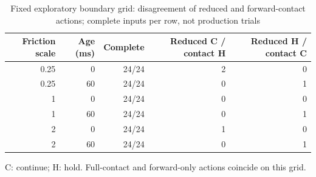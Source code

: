 \begin{table}[t]
\caption{Fixed exploratory boundary grid: disagreement of reduced and forward-contact actions; complete inputs per row, not production trials}
\label{tab:boundary}
\centering\small
\begin{tabular}{rrrrr}
\toprule
Friction scale & Age (ms) & Complete & Reduced C / contact H & Reduced H / contact C\\
\midrule
0.25 & 0 & 24/24 & 2 & 0\\
0.25 & 60 & 24/24 & 0 & 1\\
1 & 0 & 24/24 & 0 & 0\\
1 & 60 & 24/24 & 0 & 1\\
2 & 0 & 24/24 & 1 & 0\\
2 & 60 & 24/24 & 0 & 1\\
\bottomrule
\end{tabular}
\par\smallskip\footnotesize C: continue; H: hold. Full-contact and forward-only actions coincide on this grid.
\end{table}
